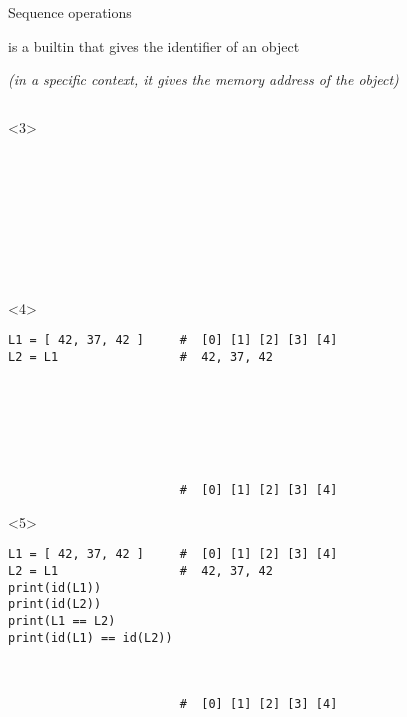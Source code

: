 \begin{frame}[fragile]{Sequence operations}

    is a builtin that gives the identifier of an object

   {\footnotesize \textit{(in a specific context, it gives the memory address of the object)} }

  \begin{center}

  \begin{columns}[onlytextwidth]
    \begin{column}{\textwidth}

      \begin{onlyenv}<3>
        \begin{lstlisting}[style=python,morekeywords={for, in, range, list}]









 \end{lstlisting}
      \end{onlyenv}

      \begin{onlyenv}<4>
        \begin{lstlisting}[style=python,morekeywords={for, in, range, list}]
L1 = [ 42, 37, 42 ]     #  [0] [1] [2] [3] [4]
L2 = L1                 #  42, 37, 42







                        #  [0] [1] [2] [3] [4] \end{lstlisting}
      \end{onlyenv}

      \begin{onlyenv}<5>
        \begin{lstlisting}[style=python,morekeywords={for, in, range, list}]
L1 = [ 42, 37, 42 ]     #  [0] [1] [2] [3] [4]
L2 = L1                 #  42, 37, 42
print(id(L1))
print(id(L2))
print(L1 == L2)
print(id(L1) == id(L2))



                        #  [0] [1] [2] [3] [4] \end{lstlisting}
      \end{onlyenv}


\end{column}
\end{columns}
\end{center}
\end{frame}
